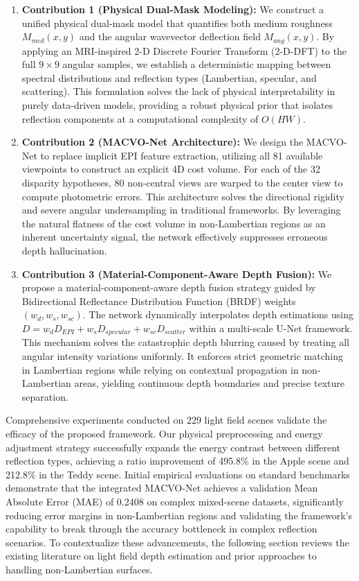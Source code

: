 \documentclass[lettersize,journal]{IEEEtran}
\begin{document}
\begin{enumerate}
    \item \textbf{Contribution 1 (Physical Dual-Mask Modeling):} We construct a unified physical dual-mask model that quantifies both medium roughness $M_{med}(x,y)$ and the angular wavevector deflection field $M_{ang}(x,y)$. By applying an MRI-inspired 2-D Discrete Fourier Transform (2-D-DFT) to the full $9 \times 9$ angular samples, we establish a deterministic mapping between spectral distributions and reflection types (Lambertian, specular, and scattering). This formulation solves the lack of physical interpretability in purely data-driven models, providing a robust physical prior that isolates reflection components at a computational complexity of $O(HW)$.
    
    \item \textbf{Contribution 2 (MACVO-Net Architecture):} We design the MACVO-Net to replace implicit EPI feature extraction, utilizing all 81 available viewpoints to construct an explicit 4D cost volume. For each of the 32 disparity hypotheses, 80 non-central views are warped to the center view to compute photometric errors. This architecture solves the directional rigidity and severe angular undersampling in traditional frameworks. By leveraging the natural flatness of the cost volume in non-Lambertian regions as an inherent uncertainty signal, the network effectively suppresses erroneous depth hallucination.
    
    \item \textbf{Contribution 3 (Material-Component-Aware Depth Fusion):} We propose a material-component-aware depth fusion strategy guided by Bidirectional Reflectance Distribution Function (BRDF) weights $(w_d, w_s, w_{sc})$. The network dynamically interpolates depth estimations using $D = w_d D_{EPI} + w_s D_{specular} + w_{sc} D_{scatter}$ within a multi-scale U-Net \cite{ronneberger2015} framework. This mechanism solves the catastrophic depth blurring caused by treating all angular intensity variations uniformly. It enforces strict geometric matching in Lambertian regions while relying on contextual propagation in non-Lambertian areas, yielding continuous depth boundaries and precise texture separation.
\end{enumerate}

Comprehensive experiments conducted on 229 light field scenes validate the efficacy of the proposed framework. Our physical preprocessing and energy adjustment strategy successfully expands the energy contrast between different reflection types, achieving a ratio improvement of 495.8\% in the Apple scene and 212.8\% in the Teddy scene. Initial empirical evaluations on standard benchmarks \cite{honauer2016} demonstrate that the integrated MACVO-Net achieves a validation Mean Absolute Error (MAE) of 0.2408 on complex mixed-scene datasets, significantly reducing error margins in non-Lambertian regions and validating the framework's capability to break through the accuracy bottleneck in complex reflection scenarios. To contextualize these advancements, the following section reviews the existing literature on light field depth estimation and prior approaches to handling non-Lambertian surfaces.
\end{document}

